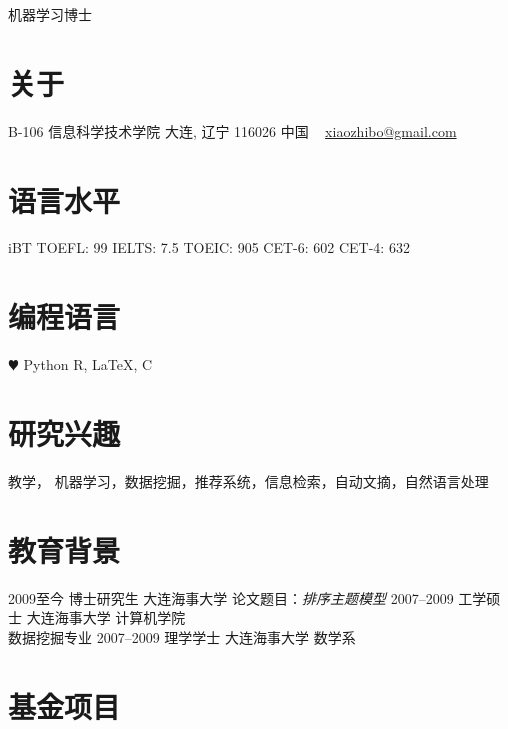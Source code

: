 \documentclass[]{friggeri-cv}
\begin{document}
       {机器学习博士}


\begin{aside}
  \section{关于}
    B-106
    信息科学技术学院
    大连, 辽宁 116026
    中国
    ~
    \href{mailto:xiaozhibo@gmail.com}{xiaozhibo@gmail.com}
  \section{语言水平}
    iBT TOEFL: 99
    IELTS: 7.5
    TOEIC: 905
    CET-6: 602
    CET-4: 632
  \section{编程语言}
    {\color{red} $\varheartsuit$} Python
    R, \LaTeX, C
\end{aside}

\section{研究兴趣}

教学， 机器学习，数据挖掘，推荐系统，信息检索，自动文摘，自然语言处理


\section{教育背景}


\begin{entrylist}
  \entry
    {2009至今}
    {博士研究生}
    {大连海事大学}
    {论文题目：\emph{排序主题模型}}
  \entry
    {2007–2009}
    {工学硕士}
    {大连海事大学}
    {计算机学院\\
    数据挖掘专业}
  \entry
    {2007–2009}
    {理学学士}
    {大连海事大学}
    {数学系}
\end{entrylist}

\section{基金项目}
\end{document}
